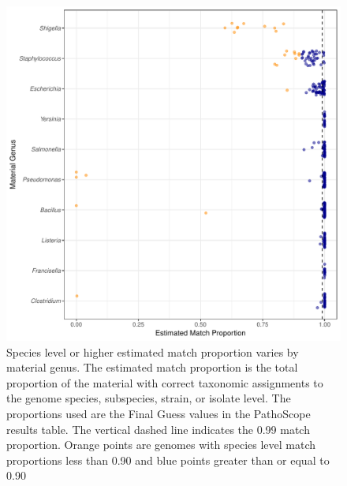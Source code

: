 \documentclass[fleqn,10pt,lineno]{wlpeerj}\usepackage[]{graphicx}\usepackage[]{color}
\makeatletter
\def\maxwidth{ %
  \ifdim\Gin@nat@width>\linewidth
    \linewidth
  \else
    \Gin@nat@width
  \fi
}
\newenvironment{knitrout}{}{} %
\makeatother
\begin{document}
\begin{knitrout}
\color{fgcolor}\begin{figure}
\includegraphics[width=\maxwidth]{figure/species_prop-1} \caption[Species level or higher estimated match proportion varies by material genus]{Species level or higher estimated match proportion varies by material genus. The estimated match proportion is the total proportion of the material with correct taxonomic assignments to the genome species, subspecies, strain, or isolate level. The proportions used are the Final Guess values in the PathoScope results table. The vertical dashed line indicates the 0.99 match proportion. Orange points are genomes with species level match proportions less than 0.90 and blue points greater than or equal to 0.90}\label{fig:species_prop}
\end{figure}


\end{knitrout}
\end{document}
